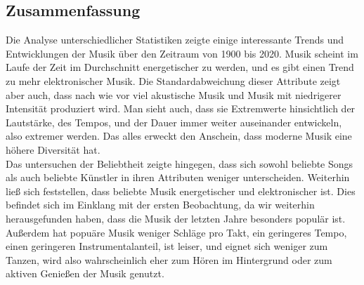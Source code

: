 \documentclass[conference]{IEEEtran}
\begin{document}
\subsection{Zusammenfassung}
Die Analyse unterschiedlicher Statistiken zeigte einige interessante Trends und Entwicklungen der Musik über den Zeitraum von 1900 bis 2020. Musik scheint im Laufe der Zeit im Durchschnitt energetischer zu werden, und es gibt einen Trend zu mehr elektronischer Musik. Die Standardabweichung dieser Attribute zeigt aber auch, dass nach wie vor viel akustische Musik und Musik mit niedrigerer Intensität produziert wird. Man sieht auch, dass sie Extremwerte hinsichtlich der Lautstärke, des Tempos, und der Dauer immer weiter auseinander entwickeln, also extremer werden. Das alles erweckt den Anschein, dass moderne Musik eine höhere Diversität hat. \\
Das untersuchen der Beliebtheit zeigte hingegen, dass sich sowohl beliebte Songs als auch beliebte Künstler in ihren Attributen weniger unterscheiden. Weiterhin ließ sich feststellen, dass beliebte Musik energetischer und elektronischer ist. Dies befindet sich im Einklang mit der ersten Beobachtung, da wir weiterhin herausgefunden haben, dass die Musik der letzten Jahre besonders populär ist. Außerdem hat popuäre Musik weniger Schläge pro Takt, ein geringeres Tempo, einen geringeren Instrumentalanteil, ist leiser, und eignet sich weniger zum Tanzen, wird also wahrscheinlich eher zum Hören im Hintergrund oder zum aktiven Genießen der Musik genutzt. 
\end{document}
